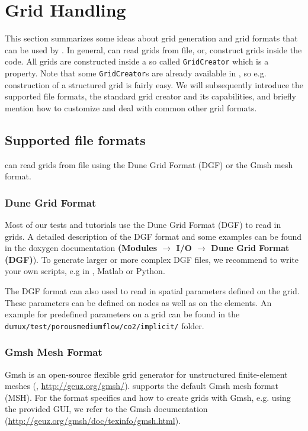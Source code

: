 \section{Grid Handling}
\label{sec:gridhandling}

This section summarizes some ideas about grid generation and grid formats that can be used by \Dumux. In general,
\Dumux can read grids from file, or, construct grids inside the code. All grids are constructed inside a so called \texttt{GridCreator} which is a \Dumux property.
Note that some \texttt{GridCreator}s are already available in \Dumux, so e.g.
construction of a structured grid is fairly easy. We will subsequently introduce the supported file formats, the standard grid creator and its capabilities,
and briefly mention how to customize and deal with common other grid formats.

\subsection{Supported file formats}
\Dumux can read grids from file using the Dune Grid Format (DGF) or the Gmsh mesh format.

\subsubsection{Dune Grid Format}
Most of our \Dumux tests and tutorials use the Dune Grid Format (DGF) to read in grids. A detailed description
of the DGF format and some examples can be found in the \Dune doxygen documentation
\textbf{(Modules $\rightarrow$ I/O $\rightarrow$ Dune Grid Format (DGF)}). To generate larger or more
complex DGF files, we recommend to write your own scripts, e.g in \Cplusplus, Matlab or Python.

The DGF format can also used to read in spatial parameters defined on the grid. These parameters can
be defined on nodes as well as on the elements. An example for predefined parameters on a grid
can be found in the  \texttt{dumux/test/porousmediumflow/co2/implicit/} folder.

\subsubsection{Gmsh Mesh Format}
Gmsh is an open-source flexible grid generator for unstructured finite-element meshes (\cite{GEUZAINE2009}, \url{http://geuz.org/gmsh/}).
\Dumux supports the default Gmsh mesh format (MSH). For the format specifics and how to create grids with Gmsh, e.g. using
the provided GUI, we refer to the Gmsh documentation (\url{http://geuz.org/gmsh/doc/texinfo/gmsh.html}).

